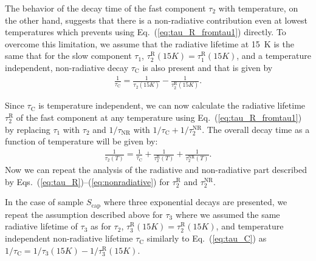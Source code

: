 The behavior of the decay time of the fast component $\tau_2$ with temperature, on the other hand, suggests that there is a non-radiative contribution even at lowest temperatures which prevents using Eq.~(\ref{eq:tau_R_fromtau1}) directly. To overcome this limitation, we assume that the radiative lifetime at 15~K is the same that for the slow component $\tau_1$, $\tau_2^\mathrm{R}(15K)=\tau_1^\mathrm{R}(15K)$, and a temperature independent, non-radiative decay $\tau_\mathrm{C}$ is also present and that is given by
%
\begin{eqnarray}
\frac{1}{\tau_\mathrm{C}}=\frac{1}{\tau_2(15K)}-\frac{1}{\tau_2^\mathrm{R}(15K)}.\label{eq:tau_C}
\end{eqnarray}

Since $\tau_\mathrm{C}$ is temperature independent, we can now calculate the radiative lifetime $\tau_2^\mathrm{R}$ of the fast component at any temperature using Eq.~(\ref{eq:tau_R_fromtau1}) by replacing $\tau_1$ with $\tau_2$ and $1/\tau_\mathrm{NR}$ with $1/\tau_\mathrm{C}+1/\tau_2^\mathrm{NR}$. The overall decay time as a function of temperature will be given by:
\begin{eqnarray}
\frac{1}{\tau_2(T)}=\frac{1}{\tau_\mathrm{C}}+\frac{1}{\tau_2^\mathrm{R}(T)}+\frac{1}{\tau_2^\mathrm{NR}(T)}.
\end{eqnarray}
%
Now we can repeat the analysis of the radiative and non-radiative part described by Eqs.~(\ref{eq:tau_R})--(\ref{eq:nonradiative}) for $\tau_2^\mathrm{R}$ and $\tau_2^\mathrm{NR}$.

In the case of sample $S_\mathrm{cap}$ where three exponential decays are presented, we repeat the assumption described above for $\tau_3$ where we assumed the same radiative lifetime of $\tau_3$ as for $\tau_2$, $\tau_3^\mathrm{R}(15K)=\tau_2^\mathrm{R}(15K)$, and temperature independent non-radiative lifetime $\tau_\mathrm{C}$ similarly to Eq.~(\ref{eq:tau_C}) as $1 / \tau_\mathrm{C} = 1/ \tau_3(15K)-1/ \tau_3^\mathrm{R}(15K)$.

